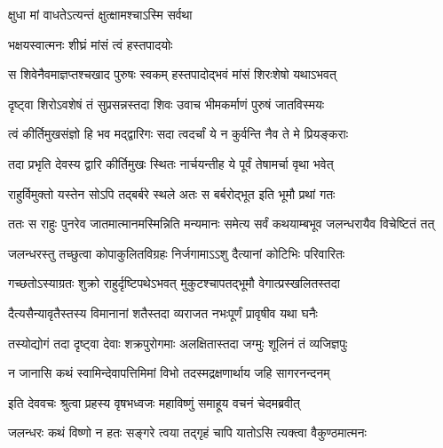 \onelineshloka
{क्षुधा मां वाधतेऽत्यन्तं क्षुत्क्षामश्चाऽस्मि सर्वथा} %




\onelineshloka
{भक्षयस्वात्मनः शीघ्रं मांसं त्वं हस्तपादयोः} %


\twolineshloka
{स शिवेनैवमाज्ञप्तश्चखाद पुरुषः स्वकम्}
{हस्तपादोद्भवं मांसं शिरःशेषो यथाऽभवत्} %

\twolineshloka
{दृष्ट्वा शिरोऽवशेषं तं सुप्रसन्नस्तदा शिवः}
{उवाच भीमकर्माणं पुरुषं जातविस्मयः} %


\twolineshloka
{त्वं कीर्तिमुखसंज्ञो हि भव मद्द्वारिगः सदा}
{त्वदर्चां ये न कुर्वन्ति नैव ते मे प्रियङ्कराः} %


\twolineshloka
{तदा प्रभृति देवस्य द्वारि कीर्तिमुखः स्थितः}
{नार्चयन्तीह ये पूर्वं तेषामर्चा वृथा भवेत्} %

\twolineshloka
{राहुर्विमुक्तो यस्तेन सोऽपि तद्बर्बरे स्थले}
{अतः स बर्बरोद्भूत इति भूमौ प्रथां गतः} %

\twolineshloka
{ततः स राहुः पुनरेव जातमात्मानमस्मिन्निति मन्यमानः}
{समेत्य सर्वं कथयाम्बभूव जलन्धरायैव विचेष्टितं तत्} %





\twolineshloka
{जलन्धरस्तु तच्छुत्वा कोपाकुलितविग्रहः}
{निर्जगामाऽऽशु दैत्यानां कोटिभिः परिवारितः} %

\twolineshloka
{गच्छतोऽस्याग्रतः शुक्रो राहुर्दृष्टिपथेऽभवत्}
{मुकुटश्चापतद्भूमौ वेगात्प्रस्खलितस्तदा} %

\twolineshloka
{दैत्यसैन्यावृतैस्तस्य विमानानां शतैस्तदा}
{व्यराजत नभःपूर्णं प्रावृषीव यथा घनैः} %

\twolineshloka
{तस्योद्योगं तदा दृष्ट्वा देवाः शक्रपुरोगमाः}
{अलक्षितास्तदा जग्मुः शूलिनं तं व्यजिज्ञपुः} %


\twolineshloka
{न जानासि कथं स्वामिन्देवापत्तिमिमां विभो}
{तदस्मद्रक्षणार्थाय जहि सागरनन्दनम्} %


\twolineshloka
{इति देववचः श्रुत्वा प्रहस्य वृषभध्वजः}
{महाविष्णुं समाहूय वचनं चेदमब्रवीत्} %


\twolineshloka
{जलन्धरः कथं विष्णो न हतः सङ्गरे त्वया}
{तद्गृहं चापि यातोऽसि त्यक्त्वा वैकुण्ठमात्मनः} %


